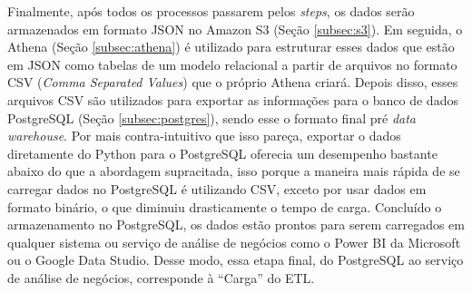 Finalmente, após todos os processos passarem pelos \textit{steps}, os dados serão armazenados em formato JSON no Amazon S3 (Seção \ref{subsec:s3}). Em seguida, o Athena (Seção \ref{subsec:athena}) é utilizado para estruturar esses dados que estão em JSON como tabelas de um modelo relacional a partir de arquivos no formato CSV (\textit{Comma Separated Values}) que o próprio Athena criará. Depois disso, esses arquivos CSV são utilizados para exportar as informações para o banco de dados PostgreSQL (Seção \ref{subsec:postgres}), sendo esse o formato final pré \textit{data warehouse}. Por mais contra-intuitivo que isso pareça, exportar o dados diretamente do Python para o PostgreSQL oferecia um desempenho bastante abaixo do que a abordagem supracitada, isso porque a maneira mais rápida de se carregar dados no PostgreSQL é utilizando CSV, exceto por usar dados em formato binário, o que diminuiu drasticamente o tempo de carga. Concluído o armazenamento no PostgreSQL, os dados estão prontos para serem carregados em qualquer sistema ou serviço de análise de negócios como o Power BI da Microsoft ou o Google Data Studio. Desse modo, essa etapa final, do PostgreSQL ao serviço de análise de negócios, corresponde à \enquote{Carga} do ETL.
